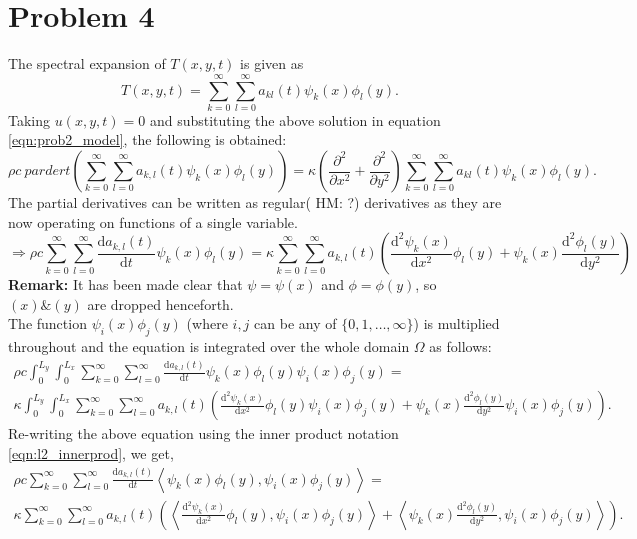 \documentclass[12pt]{article}
\newcommand{\HM}[1]{{\color{green} HM: #1}}
\newcommand{\parder}[2]{\frac{\partial #1}{\partial #2}}
\newcommand{\der}[2]{\frac{\mathrm{d} #1}{\mathrm{d} #2}}
\newcommand{\dotprod}[2]{\left\langle #1, #2 \right\rangle}
\begin{document}
\section*{Problem 4}
The spectral expansion of $T(x,y,t)$ is given as
\begin{equation}
T(x,y,t) = \sum_{k=0}^\infty\sum_{l=0}^\infty a_{kl}(t)\psi_k(x)\phi_l(y).
\end{equation}
Taking $u(x,y,t) = 0$ and substituting the above solution in equation \eqref{eqn:prob2_model}, the following is obtained:
\begin{equation}
\rho c\ parder{ }{t} \left(\sum_{k=0}^\infty\sum_{l=0}^\infty a_{k,l}(t)\psi_k(x)\phi_l(y)\right) = \kappa \left(\parder{^2}{x^2} + \parder{^2}{y^2}\right)\sum_{k=0}^\infty\sum_{l=0}^\infty a_{kl}(t)\psi_k(x)\phi_l(y).
\end{equation}
The partial derivatives can be written as regular(\HM{?}) derivatives as they are now operating on functions of a single variable.
\begin{equation}
\Rightarrow \rho c \sum_{k=0}^\infty\sum_{l=0}^\infty \der{a_{k,l}(t)}{t} \psi_k(x)\phi_l(y) = \kappa \sum_{k=0}^\infty\sum_{l=0}^\infty a_{k,l}(t) \left(\der{^2 \psi_{k}(x)}{x^2}\phi_l(y) + \psi_k(x)\der{^2\phi_l(y)}{y^2}\right)
\end{equation}
\textbf{Remark:} It has been made clear that $\psi = \psi(x)$ and $\phi = \phi(y)$, so $(x) \& (y)$ are dropped henceforth.\\
The function $\psi_i(x)\phi_j(y)$ (where $i,j$ can be any of $\{0,1,\ldots,\infty\}$) is multiplied throughout and the equation is integrated over the whole domain $\Omega$ as follows:
\begin{multline}
\rho c \int_{0}^{L_y}\int_0^{L_x}\sum_{k=0}^\infty\sum_{l=0}^\infty \der{a_{k,l}(t)}{t} \psi_k(x)\phi_l(y) \psi_i(x)\phi_j(y) = \\ \kappa \int_{0}^{L_y}\int_0^{L_x} \sum_{k=0}^\infty\sum_{l=0}^\infty a_{k,l}(t) \left(\der{^2 \psi_{k}(x)}{x^2}\phi_l(y)\psi_i(x)\phi_j(y) + \psi_k(x)\der{^2\phi_l(y)}{y^2}\psi_i(x)\phi_j(y)\right).
\end{multline}
Re-writing the above equation using the inner product notation \eqref{eqn:l2_innerprod}, we get, 
\begin{multline}
\rho c \sum_{k=0}^\infty\sum_{l=0}^\infty \der{a_{k,l}(t)}{t} \dotprod{\psi_k(x)\phi_l(y)}{\psi_i(x)\phi_j(y)} = \\ \kappa \sum_{k=0}^\infty\sum_{l=0}^\infty a_{k,l}(t) \left(\dotprod{\der{^2 \psi_{k}(x)}{x^2}\phi_l(y)}{\psi_i(x)\phi_j(y)} + \dotprod{\psi_k(x)\der{^2\phi_l(y)}{y^2}}{\psi_i(x)\phi_j(y)}\right).
\label{eqn:galerkin_deriv3}
\end{multline}
\end{document}
